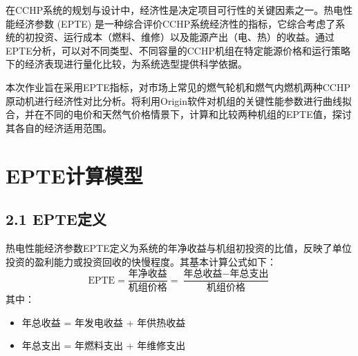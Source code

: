 \documentclass[12pt]{ctexart}
\begin{document}
在CCHP系统的规划与设计中，经济性是决定项目可行性的关键因素之一。热电性能经济参数 (EPTE) 是一种综合评价CCHP系统经济性的指标，它综合考虑了系统的初投资、运行成本（燃料、维修）以及能源产出（电、热）的收益。通过EPTE分析，可以对不同类型、不同容量的CCHP机组在特定能源价格和运行策略下的经济表现进行量化比较，为系统选型提供科学依据。

本次作业旨在采用EPTE指标，对市场上常见的燃气轮机和燃气内燃机两种CCHP原动机进行经济性对比分析。将利用Origin软件对机组的关键性能参数进行曲线拟合，并在不同的电价和天然气价格情景下，计算和比较两种机组的EPTE值，探讨其各自的经济适用范围。

\section{EPTE计算模型}
\subsection{2.1 EPTE定义}
热电性能经济参数EPTE定义为系统的年净收益与机组初投资的比值，反映了单位投资的盈利能力或投资回收的快慢程度。其基本计算公式如下：
\[
\text{EPTE} = \frac{\text{年净收益}}{\text{机组价格}} = \frac{\text{年总收益} - \text{年总支出}}{\text{机组价格}}
\]
其中：
\begin{itemize}
    \item 年总收益 = 年发电收益 + 年供热收益
    \item 年总支出 = 年燃料支出 + 年维修支出
\end{itemize}
\end{document}
